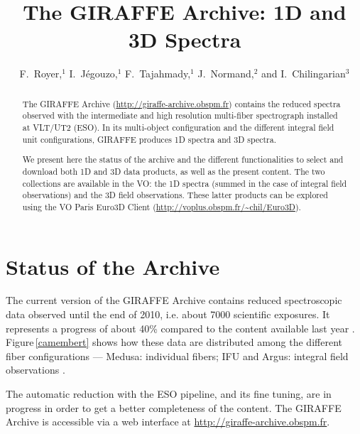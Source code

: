 
\resetcounters



\title{The GIRAFFE Archive: 1D and 3D Spectra}
\author{F.~Royer,$^1$ I.~J\'egouzo,$^1$ F.~Tajahmady,$^1$ J.~Normand,$^2$ and I.~Chilingarian$^3$
}


\begin{abstract}
 The GIRAFFE Archive (\url{http://giraffe-archive.obspm.fr}) contains the reduced spectra observed with the intermediate and high resolution multi-fiber spectrograph installed at VLT/UT2 (ESO). In its multi-object configuration and the different integral field unit configurations, GIRAFFE produces 1D spectra and 3D spectra.

We present here the status of the archive and the different functionalities to select and download both 1D and 3D data products, as well as the present content. The two collections are available in the VO: the 1D spectra (summed in the case of integral field observations) and the 3D field observations. These latter products can be explored using the VO Paris Euro3D Client (\url{http://voplus.obspm.fr/~chil/Euro3D}). 
\end{abstract}

\section{Status of the Archive}

 The current version of the GIRAFFE Archive contains reduced spectroscopic data observed until the end of 2010, i.e. about 7000 scientific exposures. It represents a progress of about 40\% compared to the content available last year \citep{Ror_12}.
Figure\,\ref{camembert} shows how these data are distributed among the different fiber configurations --- Medusa: individual fibers; IFU and Argus: integral field observations \citep[details about the instrument can be found in][]{Pai_02}. 

 The automatic reduction with the ESO pipeline, and its fine tuning, are in progress in order to get a better completeness of the content. The GIRAFFE Archive is accessible via a web interface at \url{http://giraffe-archive.obspm.fr}.


